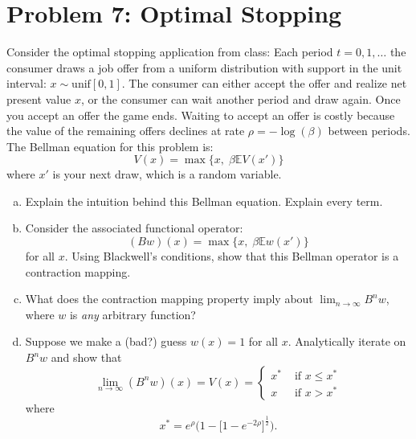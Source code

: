 \documentclass[11pt]{extarticle}
\theoremstyle{plain}
\theoremstyle{definition}
\begin{document}
\section*{Problem 7: Optimal Stopping}

Consider the optimal stopping application from class: Each period $t = 0, 1, \ldots$ the consumer draws a job offer from a uniform distribution with support in the unit interval: $x \sim \text{unif}[0, 1]$. The consumer can either accept the offer and realize net present value $x$, or the consumer can wait another period and draw again. Once you accept an offer the game ends. Waiting to accept an offer is costly because the value of the remaining offers declines at rate $\rho = - \log(\beta)$ between periods. The Bellman equation for this problem is:
\begin{equation*}
	V(x) = \max \bigg\{ x, \; \beta \mathbb E V(x') \bigg\}
\end{equation*}
where $x'$ is your next draw, which is a random variable.


\vspace{2mm}
\begin{enumerate}[(a)]
\item Explain the intuition behind this Bellman equation. Explain every term.

\item Consider the associated functional operator:
\begin{equation*}
	(Bw)(x) = \max \bigg\{ x, \; \beta \mathbb E w(x') \bigg\}
\end{equation*}
for all $x$. Using Blackwell's conditions, show that this Bellman operator is a contraction mapping. 

\item What does the contraction mapping property imply about $\lim_{n \to \infty} B^n w$, where $w$ is \textit{any} arbitrary function? 

\item Suppose we make a (bad?) guess $w(x) = 1$ for all $x$. Analytically iterate on $B^n w$ and show that 
\begin{equation*}
	\lim_{n \to \infty} (B^n w) (x) = V(x) = \begin{cases}
		x^* & \text { if } x \leq x^* \\
		x & \text { if } x > x^*
	\end{cases}
\end{equation*}
where
\begin{equation*}
	x^* = e^\rho \bigg( 1 - \Big[ 1 - e^{- 2 \rho} \Big]^\frac{1}{2} \bigg).
\end{equation*}
\end{enumerate}
\end{document}
